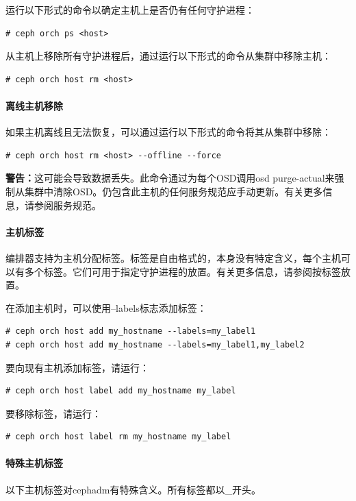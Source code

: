 \documentclass[12pt,UTF8]{ctexbook}
\begin{document}
运行以下形式的命令以确定主机上是否仍有任何守护进程：
\begin{verbatim}
# ceph orch ps <host>
\end{verbatim}

从主机上移除所有守护进程后，通过运行以下形式的命令从集群中移除主机：
\begin{verbatim}
# ceph orch host rm <host>
\end{verbatim}

\paragraph{离线主机移除}

如果主机离线且无法恢复，可以通过运行以下形式的命令将其从集群中移除：
\begin{verbatim}
# ceph orch host rm <host> --offline --force
\end{verbatim}

\textbf{警告：}这可能会导致数据丢失。此命令通过为每个OSD调用osd purge-actual来强制从集群中清除OSD。仍包含此主机的任何服务规范应手动更新。有关更多信息，请参阅服务规范。

\paragraph{主机标签}

编排器支持为主机分配标签。标签是自由格式的，本身没有特定含义，每个主机可以有多个标签。它们可用于指定守护进程的放置。有关更多信息，请参阅按标签放置。

在添加主机时，可以使用--labels标志添加标签：
\begin{verbatim}
# ceph orch host add my_hostname --labels=my_label1
# ceph orch host add my_hostname --labels=my_label1,my_label2
\end{verbatim}

要向现有主机添加标签，请运行：
\begin{verbatim}
# ceph orch host label add my_hostname my_label
\end{verbatim}

要移除标签，请运行：
\begin{verbatim}
# ceph orch host label rm my_hostname my_label
\end{verbatim}

\paragraph{特殊主机标签}

以下主机标签对cephadm有特殊含义。所有标签都以_开头。
\end{document}
